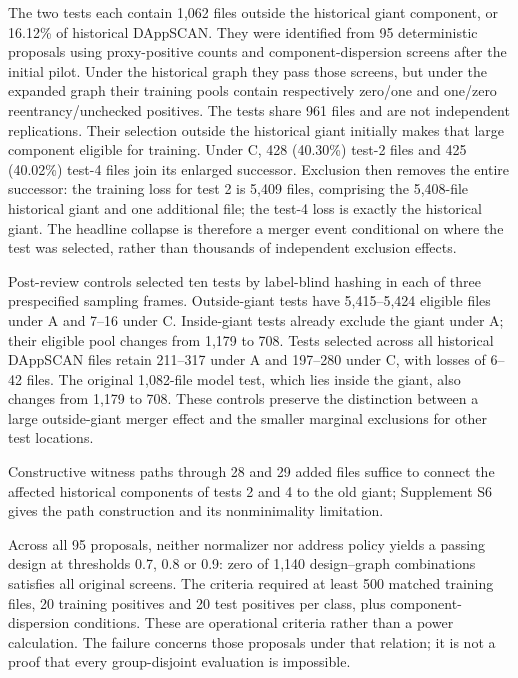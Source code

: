 \documentclass[preprint,12pt]{elsarticle}
\begin{document}
The two tests each contain 1,062 files outside the historical giant component, or 16.12\% of historical DAppSCAN. They were identified from 95 deterministic proposals using proxy-positive counts and component-dispersion screens after the initial pilot. Under the historical graph they pass those screens, but under the expanded graph their training pools contain respectively zero/one and one/zero reentrancy/unchecked positives. The tests share 961 files and are not independent replications. Their selection outside the historical giant initially makes that large component eligible for training. Under C, 428 (40.30\%) test-2 files and 425 (40.02\%) test-4 files join its enlarged successor. Exclusion then removes the entire successor: the training loss for test 2 is 5,409 files, comprising the 5,408-file historical giant and one additional file; the test-4 loss is exactly the historical giant. The headline collapse is therefore a merger event conditional on where the test was selected, rather than thousands of independent exclusion effects.

Post-review controls selected ten tests by label-blind hashing in each of three prespecified sampling frames. Outside-giant tests have 5,415--5,424 eligible files under A and 7--16 under C. Inside-giant tests already exclude the giant under A; their eligible pool changes from 1,179 to 708. Tests selected across all historical DAppSCAN files retain 211--317 under A and 197--280 under C, with losses of 6--42 files. The original 1,082-file model test, which lies inside the giant, also changes from 1,179 to 708. These controls preserve the distinction between a large outside-giant merger effect and the smaller marginal exclusions for other test locations.

Constructive witness paths through 28 and 29 added files suffice to connect the affected historical components of tests 2 and 4 to the old giant; Supplement S6 gives the path construction and its nonminimality limitation.

Across all 95 proposals, neither normalizer nor address policy yields a passing design at thresholds 0.7, 0.8 or 0.9: zero of 1,140 design--graph combinations satisfies all original screens. The criteria required at least 500 matched training files, 20 training positives and 20 test positives per class, plus component-dispersion conditions. These are operational criteria rather than a power calculation. The failure concerns those proposals under that relation; it is not a proof that every group-disjoint evaluation is impossible.
\end{document}
